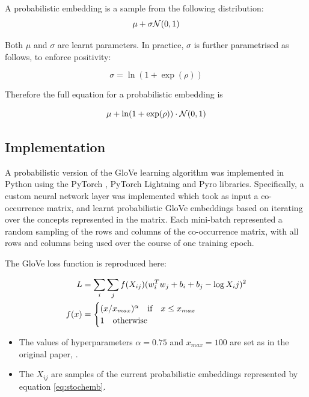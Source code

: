 A probabilistic embedding is a sample from the following distribution:
\begin{equation}
    \mu + \sigma \mathcal{N}(0, 1)
\end{equation}

Both $\mu$ and $\sigma$ are learnt parameters. In practice, $\sigma$ is further parametrised as follows, to enforce positivity:

\begin{equation}
    \sigma = \ln (1 + \exp (\rho))
\end{equation}

Therefore the full equation for a probabilistic embedding is 

\begin{equation}
\label{eq:stochemb}
    \mu + \ln (1 + \exp(\rho)) \cdot \mathcal{N}(0, 1)
\end{equation}

\subsection{Implementation}

A probabilistic version of the GloVe learning algorithm was implemented in Python using the PyTorch \cite{pytorch}, PyTorch Lightning \cite{pytorchlightning} and Pyro \cite{pyro} libraries. Specifically, a custom neural network layer was implemented which took as input a co-occurrence matrix, and learnt probabilistic GloVe embeddings based on iterating over the concepts represented in the matrix. Each mini-batch represented a random sampling of the rows and columns of the co-occurrence matrix, with all rows and columns being used over the course of one training epoch. 

The GloVe loss function is reproduced here:

\begin{equation}
\label{eq:gloveloss}
\begin{split}
L &= \sum_i \sum_j f(X_{ij}) (w_i^T w_j + b_i + b_j - \log X_ij)^2\\
f(x) &= \begin{cases}
(x/x_{max})^{\alpha}\quad \text{if} \quad x \le x_{max}\\
1\quad \text{otherwise} \quad
\end{cases}
\end{split}
\end{equation}

\begin{itemize}
    \item The values of hyperparameters $\alpha = 0.75$ and $x_{max} = 100$  are set as in the original paper, \cite{pennington2014glove}. 
    \item The $X_{ij}$ are samples of the current probabilistic embeddings represented by equation \ref{eq:stochemb}. 
\end{itemize}

